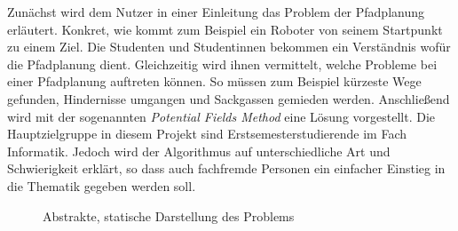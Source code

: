 Zunächst wird dem Nutzer in einer Einleitung das Problem der Pfadplanung erläutert. Konkret, wie kommt zum Beispiel ein Roboter von seinem Startpunkt zu einem Ziel. Die Studenten und Studentinnen bekommen ein Verständnis wofür die Pfadplanung dient. Gleichzeitig wird ihnen vermittelt, welche Probleme bei einer Pfadplanung auftreten können. So müssen zum Beispiel kürzeste Wege gefunden, Hindernisse umgangen und Sackgassen gemieden werden. Anschließend wird mit der sogenannten \textit{Potential Fields Method} eine Lösung vorgestellt. Die Hauptzielgruppe in diesem Projekt sind Erstsemesterstudierende im Fach Informatik. Jedoch wird der Algorithmus auf unterschiedliche Art und Schwierigkeit erklärt, so dass auch fachfremde Personen ein einfacher Einstieg in die Thematik gegeben werden soll. 


\begin{figure}[ht!]
  \centering
  \caption{Abstrakte, statische Darstellung des Problems}
  \label{fig:bbstatic}
\end{figure}


